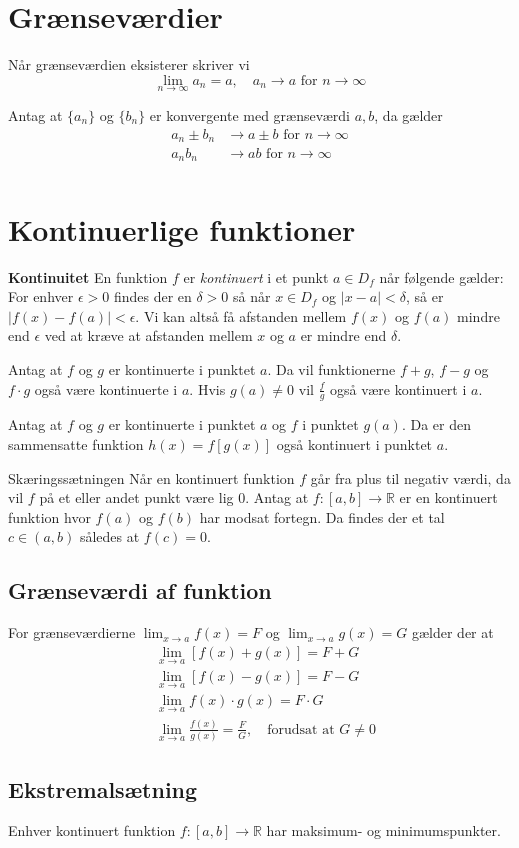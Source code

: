 \section{Grænseværdier}
Når grænseværdien eksisterer skriver vi\begin{equation}
    \lim_{n\to\infty}a_n=a,\quad a_n\to a\text{ for } n\to\infty
\end{equation}
\begin{theorem}Antag at $\{a_n\}$ og $\{b_n\}$ er konvergente med grænseværdi $a,b$, da gælder \begin{align*}
    a_n\pm b_n&\to a\pm b\text{     for } n\to\infty\\
    a_nb_n&\to ab\text{     for } n\to\infty\\
\end{align*}\end{theorem}

\section{Kontinuerlige funktioner}
\begin{definition}{\textbf{Kontinuitet}}
En funktion $f$ er \textit{kontinuert} i et punkt $a\in D_f$ når følgende gælder: For enhver $\epsilon>0$ findes der en $\delta>0$ så når $x\in D_f$ og $|x-a|<\delta$, så er $|f(x)-f(a)|<\epsilon$. Vi kan altså få afstanden mellem $f(x)$ og $f(a)$ mindre end $\epsilon$ ved at kræve at afstanden mellem $x$ og $a$ er mindre end $\delta$.
\end{definition}
\begin{theorem}
Antag at $f$ og $g$ er kontinuerte i punktet $a$. Da vil funktionerne $f + g$, $f - g$ og $f\cdot g$ også være kontinuerte i $a$. Hvis $g(a) \neq0$ vil $\frac{f}{g}$ også være kontinuert i $a$.
\end{theorem}
\begin{theorem}
Antag at $f$ og $g$ er kontinuerte i punktet $a$ og $f$ i punktet $g(a)$. Da er den sammensatte funktion $h(x)=f[g(x)]$ også kontinuert i punktet $a$.
\end{theorem}
\begin{theorem}{Skæringssætningen}
Når en kontinuert funktion $f$ går fra plus til negativ værdi, da vil $f$ på et eller andet punkt være lig 0. Antag at $f:[a,b]\rightarrow\mathbb{R}$ er en kontinuert funktion hvor $f(a)$ og $f(b)$ har modsat fortegn. Da findes der et tal $c\in(a,b)$ således at $f(c)=0$.
\end{theorem}
\subsection{Grænseværdi af funktion}
For grænseværdierne $\lim_{x\to a}f(x)=F$ og $\lim_{x\to a}g(x)=G$ gælder der at\begin{align}
    &\lim_{x\to a}[f(x)+g(x)]=F+G\\
    &\lim_{x\to a}[f(x)-g(x)]=F-G\\
    &\lim_{x\to a}f(x)\cdot g(x)=F\cdot G\\
    &\lim_{x\to a}\frac{f(x)}{g(x)}=\frac{F}{G},\quad\text{forudsat at }G\neq0
\end{align}

\subsection{Ekstremalsætning}
\begin{theorem}
Enhver kontinuert funktion $f:[a,b]\to\mathbb{R}$ har maksimum- og minimumspunkter.
\end{theorem}